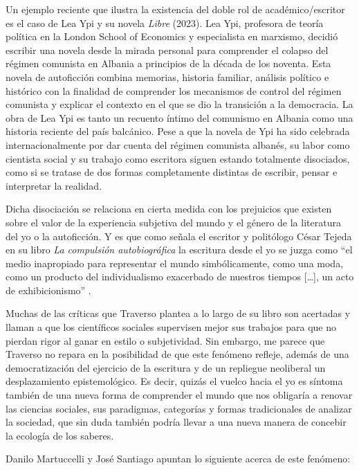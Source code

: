 \documentclass[
  spanish,
  11pt,
  a4paper,
]{scrbook}
\begin{document}
Un ejemplo reciente que ilustra la existencia del doble rol de
académico/escritor es el caso de Lea Ypi y su novela \emph{Libre}
(2023). Lea Ypi, profesora de teoría política en la London School of
Economics y especialista en marxismo, decidió escribir una novela desde
la mirada personal para comprender el colapso del régimen comunista en
Albania a principios de la década de los noventa. Esta novela de
autoficción combina memorias, historia familiar, análisis político e
histórico con la finalidad de comprender los mecanismos de control del
régimen comunista y explicar el contexto en el que se dio la transición
a la democracia. La obra de Lea Ypi es tanto un recuento íntimo del
comunismo en Albania como una historia reciente del país balcánico. Pese
a que la novela de Ypi ha sido celebrada internacionalmente por dar
cuenta del régimen comunista albanés, su labor como cientista social y
su trabajo como escritora siguen estando totalmente disociados, como si
se tratase de dos formas completamente distintas de escribir, pensar e
interpretar la realidad.

Dicha disociación se relaciona en cierta medida con los prejuicios que
existen sobre el valor de la experiencia subjetiva del mundo y el género
de la literatura del yo o la autoficción. Y es que como señala el
escritor y politólogo César Tejeda en su libro \emph{La compulsión
autobiográfica} la escritura desde el yo se juzga como ``el medio
inapropiado para representar el mundo simbólicamente, como una moda,
como un producto del individualismo exacerbado de nuestros tiempos
{[}\ldots{]}, un acto de exhibicionismo'' \autocite[17]{Tejeda2022}.

Muchas de las críticas que Traverso plantea a lo largo de su libro son
acertadas y llaman a que los científicos sociales supervisen mejor sus
trabajos para que no pierdan rigor al ganar en estilo o subjetividad.
Sin embargo, me parece que Traverso no repara en la posibilidad de que
este fenómeno refleje, además de una democratización del ejercicio de la
escritura y de un repliegue neoliberal \autocite{Traverso2022} un
desplazamiento epistemológico. Es decir, quizás el vuelco hacia el yo es
síntoma también de una nueva forma de comprender el mundo que nos
obligaría a renovar las ciencias sociales, sus paradigmas, categorías y
formas tradicionales de analizar la sociedad, que sin duda también
podría llevar a una nueva manera de concebir la ecología de los saberes.

Danilo Martuccelli y José Santiago apuntan lo siguiente acerca de este
fenómeno:
\end{document}
